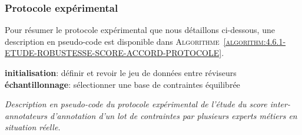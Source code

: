 		\subsubsection{Protocole expérimental}
			
			
			Pour résumer le protocole expérimental que nous détaillons ci-dessous, une description en pseudo-code est disponible dans \textsc{Algorithme~\ref{algorithm:4.6.1-ETUDE-ROBUSTESSE-SCORE-ACCORD-PROTOCOLE}}.

			\begin{algorithm}
				\textbf{initialisation}: définir et revoir le jeu de données entre réviseurs \;
				\textbf{échantillonnage}: sélectionner une base de contraintes équilibrée \;
				\caption{\textit{
					Description en pseudo-code du protocole expérimental de l'étude du score inter-annotateurs d'annotation d'un lot de contraintes par plusieurs experts métiers en situation réelle.
				}}
				\label{algorithm:4.6.1-ETUDE-ROBUSTESSE-SCORE-ACCORD-PROTOCOLE}
			\end{algorithm}
			

